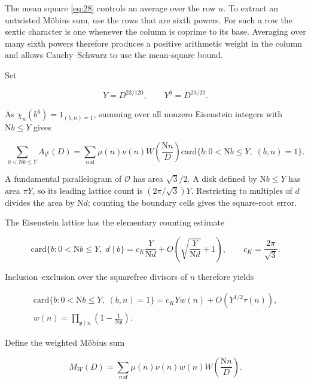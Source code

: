 \documentclass[reqno,a4paper,11pt]{amsart}
\begin{document}
The mean square \eqref{eq:28} controls an average over the row $u$. To extract an untwisted Möbius sum, use the rows that are sixth powers. For such a row the sextic character is one whenever the column is coprime to its base. Averaging over many sixth powers therefore produces a positive arithmetic weight in the column and allows Cauchy--Schwarz to use the mean-square bound.

Set

\[
Y={D}^{23/120},\quad \quad {Y}^{6}={D}^{23/20}.
\]

As ${\chi }_{n}\left( {b}^{6}\right) ={1}_{\left( b,n\right) =1}$, summing over all nonzero Eisenstein integers with $\mathrm{N}b\le Y$ gives

\begin{equation}\label{eq:29}
\sum _{0<\mathrm{N}b\le Y} {A}_{{b}^{6}}\left( D\right) =\sum _{n\,\mathrm{sf}} \mu \left( n\right) \nu \left( n\right) W\left( \frac{\mathrm{N}n}{D}\right) \mathrm{card}\{b:0<\mathrm{N}b\le Y,\;\left( b,n\right) =1\}.
\end{equation}

A fundamental parallelogram of $\mathcal{O}$ has area $\sqrt{3}/2$. A disk defined by $\mathrm{N}b\le Y$ has area $\pi Y$, so its leading lattice count is $(2\pi/\sqrt{3})Y$. Restricting to multiples of $d$ divides the area by $\mathrm{N}d$; counting the boundary cells gives the square-root error.

The Eisenstein lattice has the elementary counting estimate

\[
\mathrm{card}\{b:0<\mathrm{N}b\le Y,\;d\mid b\}={c}_{K}\frac{Y}{\mathrm{N}d}+O\left( \sqrt{\frac{Y}{\mathrm{N}d}}+1\right) ,\quad \quad {c}_{K}=\frac{2\pi }{\sqrt{3}}.
\]

Inclusion--exclusion over the squarefree divisors of $n$ therefore yields

\begin{equation}\label{eq:30}
\begin{gathered} \mathrm{card}\{b:0<\mathrm{N}b\le Y,\;\left( b,n\right) =1\}={c}_{K}Yw\left( n\right) +O\left( {Y}^{1/2}\tau \left( n\right) \right) , \\ w\left( n\right) =\prod _{\mathfrak{p}\mid n} \left( 1-\frac{1}{\mathrm{N}\mathfrak{p}}\right) . \end{gathered}
\end{equation}

Define the weighted Möbius sum

\[
{M}_{W}\left( D\right) =\sum _{n\,\mathrm{sf}} \mu \left( n\right) \nu \left( n\right) w\left( n\right) W\left( \frac{\mathrm{N}n}{D}\right) .
\]
\end{document}
